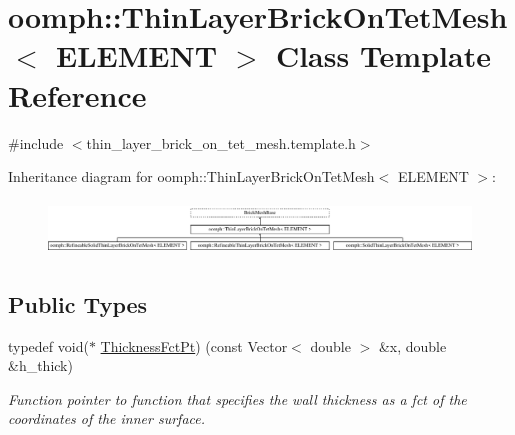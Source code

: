 \hypertarget{classoomph_1_1ThinLayerBrickOnTetMesh}{}\section{oomph\+:\+:Thin\+Layer\+Brick\+On\+Tet\+Mesh$<$ E\+L\+E\+M\+E\+NT $>$ Class Template Reference}
\label{classoomph_1_1ThinLayerBrickOnTetMesh}


{\ttfamily \#include $<$thin\+\_\+layer\+\_\+brick\+\_\+on\+\_\+tet\+\_\+mesh.\+template.\+h$>$}

Inheritance diagram for oomph\+:\+:Thin\+Layer\+Brick\+On\+Tet\+Mesh$<$ E\+L\+E\+M\+E\+NT $>$\+:\begin{figure}[H]
\begin{center}
\leavevmode
\includegraphics[height=1.458333cm]{classoomph_1_1ThinLayerBrickOnTetMesh}
\end{center}
\end{figure}
\subsection*{Public Types}
\begin{DoxyCompactItemize}
\item 
typedef void($\ast$ \hyperlink{classoomph_1_1ThinLayerBrickOnTetMesh_aed34f7d1e9a5c6b5f3e220cb5bdf4550}{Thickness\+Fct\+Pt}) (const Vector$<$ double $>$ \&x, double \&h\+\_\+thick)
\begin{DoxyCompactList}\small\item\em Function pointer to function that specifies the wall thickness as a fct of the coordinates of the inner surface. \end{DoxyCompactList}\end{DoxyCompactItemize}
